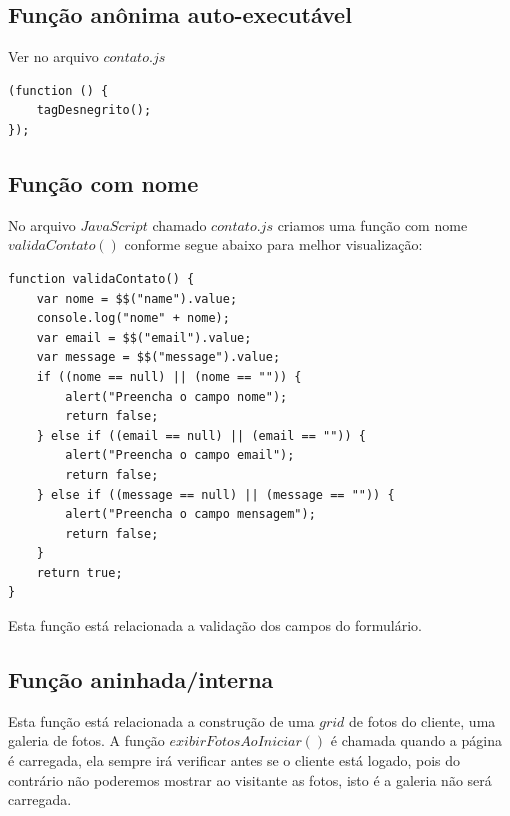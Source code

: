\subsection{Função anônima auto-executável}
	Ver no arquivo $contato.js$

\begin{lstlisting}
(function () { 
    tagDesnegrito();
});

\end{lstlisting}

\subsection{Função com nome}

	No arquivo $JavaScript$ chamado $contato.js$ criamos uma função com nome $validaContato()$ conforme segue abaixo para melhor visualização:
\begin{lstlisting}
function validaContato() {
    var nome = $$("name").value;
    console.log("nome" + nome);
    var email = $$("email").value;
    var message = $$("message").value;
    if ((nome == null) || (nome == "")) {
        alert("Preencha o campo nome");
        return false;
    } else if ((email == null) || (email == "")) {
        alert("Preencha o campo email");
        return false;
    } else if ((message == null) || (message == "")) {
        alert("Preencha o campo mensagem");
        return false;
    }
    return true;
}
\end{lstlisting}
	Esta função está relacionada a validação dos campos do formulário.

\subsection{Função aninhada/interna}

	Esta função está relacionada a construção de uma $grid$ de fotos do cliente, uma galeria de fotos. A função  $exibirFotosAoIniciar()$ é chamada quando a página é carregada, ela sempre irá  verificar antes se o cliente está logado, pois do contrário não poderemos mostrar ao visitante as fotos, isto é a galeria não será carregada. 
	
